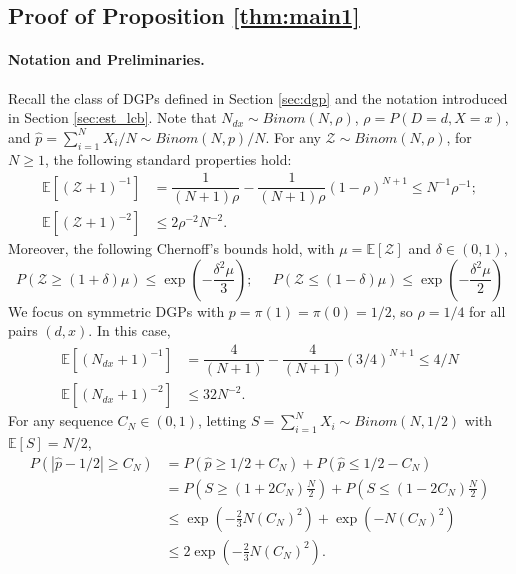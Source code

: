 \documentclass[12pt]{article}
\numberwithin{equation}{section}
\theoremstyle{plain}                         %
\theoremstyle{definition}                  %
\theoremstyle{remark}                      %
\newcommand{\E}{\mathbb{E}}
\begin{document}
\subsection{Proof of Proposition \ref{thm:main1}}
\label{sec:proof}



\paragraph{Notation and Preliminaries.} Recall the class of DGPs defined in Section \ref{sec:dgp} and the notation introduced in Section \ref{sec:est_lcb}. Note that $N_{dx} \sim Binom (N, \rho)$,  $\rho = P(D=d, X=x)$, and $\hat{p} = \sum_{i = 1}^N X_i / N \sim Binom(N, p) / N$. For any $\mathcal{Z} \sim Binom (N, \rho)$, for $N \geq 1$,  the following standard properties hold:
  \begin{align*}
\E [  (\mathcal{Z}+ 1)^{-1}   ] & = \dfrac{1}{(N+1) \rho } - \dfrac{1}{(N+1)  \rho } (1- \rho )^{N+1}  \leq N^{-1} \rho^{-1}; \\
 \E [   (\mathcal{Z} + 1)^{-2}   ]   & \leq 2  \rho^{-2}  N^{-2}.
   \end{align*}  
  Moreover, the following Chernoff's bounds hold, with $\mu = \E[\mathcal{Z}]$ and $\delta \in (0, 1)$,
  \begin{equation}
  P(\mathcal{Z} \geq (1+\delta)\mu) \leq \exp\left(-\frac{\delta^2 \mu}{3} \right); \;\;\;\;\; P(\mathcal{Z}\leq (1-\delta)\mu) \leq \exp \left(-\frac{\delta^2\mu}{2} \right)
  \end{equation}
We focus on symmetric DGPs with $p=\pi(1) = \pi(0) = 1/2$, so $\rho =1/4$ for all pairs $(d,x)$. In this case,
\begin{align}
\E [  (N_{dx} + 1)^{-1}   ] & = \dfrac{4}{(N+1) } - \dfrac{4}{(N+1)  } (3/4)^{N+1}  \leq 4/N \label{eq:mean1} \\
 \E [   (N_{dx} + 1)^{-2}   ]   & \leq 32  N^{-2}. \label{eq:mean3}
\end{align} 
For any sequence $C_N \in (0, 1)$, letting $S = \sum_{i = 1}^NX_i \sim Binom(N, 1/2)$ with $\E[S] = N/2$,
\begin{equation} \label{eq:chernoff}
\begin{array}{cl}
	P\left(\left|\hat{p} - 1/2\right| \geq C_N\right) &= P(\hat{p} \geq 1/2 + C_N) + P(\hat{p} \leq 1/2 - C_N)\\[3mm]
	&= P(S \geq (1 + 2C_N)\frac{N}{2}) + P(S \leq (1-2C_N)\frac{N}{2})\\[3mm]
	&\leq \exp \left(-\frac{2}{3}N(C_N)^2 \right) + \exp\left(-N(C_N)^2 \right)\\[3mm]
	&\leq 2\exp \left(-\frac{2}{3}N(C_N)^2 \right).
\end{array}
\end{equation}
\end{document}
